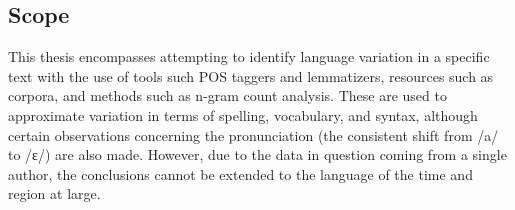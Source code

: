 \subsection{Scope}
\label{subsec:scope}

This thesis encompasses attempting to identify language variation in a specific text with the use of tools such POS taggers and lemmatizers, resources such as corpora, and methods such as n-gram count analysis. These are used to approximate variation in terms of spelling, vocabulary, and syntax, although certain observations concerning the pronunciation (the consistent shift from /a/ to /ɛ/) are also made. However, due to the data in question coming from a single author, the conclusions cannot be extended to the language of the time and region at large.